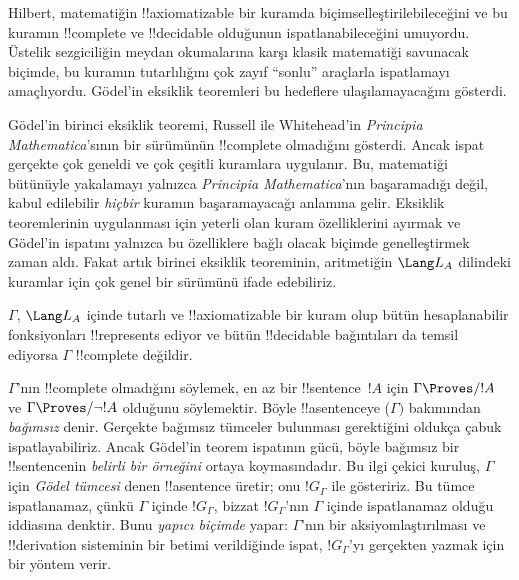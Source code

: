 



Hilbert, matematiğin !!{axiomatizable} bir kuramda biçimselleştirilebileceğini
ve bu kuramın !!{complete} ve !!{decidable} olduğunun ispatlanabileceğini
umuyordu. Üstelik sezgiciliğin meydan okumalarına karşı klasik matematiği
savunacak biçimde, bu kuramın tutarlılığını çok zayıf ``sonlu'' araçlarla
ispatlamayı amaçlıyordu. G\"odel'in eksiklik teoremleri bu hedeflere
ulaşılamayacağını gösterdi.

G\"odel'in birinci eksiklik teoremi, Russell ile Whitehead'in
\emph{Principia Mathematica}'sının bir sürümünün !!{complete} olmadığını
gösterdi. Ancak ispat gerçekte çok geneldi ve çok çeşitli kuramlara uygulanır.
Bu, matematiği bütünüyle yakalamayı yalnızca \emph{Principia Mathematica}'nın
başaramadığı değil, kabul edilebilir \emph{hiçbir} kuramın başaramayacağı
anlamına gelir. Eksiklik teoremlerinin uygulanması için yeterli olan kuram
özelliklerini ayırmak ve G\"odel'in ispatını yalnızca bu özelliklere bağlı
olacak biçimde genelleştirmek zaman aldı. Fakat artık birinci eksiklik
teoreminin, aritmetiğin $\Lang L_A$ dilindeki kuramlar için çok genel bir
sürümünü ifade edebiliriz.

\begin{thm}
$\Gamma$, $\Lang L_A$ içinde tutarlı ve !!{axiomatizable} bir kuram olup
bütün hesaplanabilir fonksiyonları !!{represents} ediyor ve bütün
!!{decidable} bağıntıları da temsil ediyorsa $\Gamma$ !!{complete} değildir.
\end{thm}

$\Gamma$'nın !!{complete} olmadığını söylemek, en az bir !!{sentence}~$!A$
için $\Gamma \Proves/ !A$ ve $\Gamma \Proves/ \lnot !A$ olduğunu söylemektir.
Böyle !!a{sentence}{}ye ($\Gamma)$ bakımından \emph{bağımsız} denir. Gerçekte
bağımsız tümceler bulunması gerektiğini oldukça çabuk ispatlayabiliriz.
Ancak G\"odel'in teorem ispatının gücü, böyle bağımsız bir !!{sentence}{}nin
\emph{belirli bir örneğini} ortaya koymasındadır. Bu ilgi çekici kuruluş,
$\Gamma$ için \emph{G\"odel tümcesi} denen !!a{sentence} üretir; onu
$!G_\Gamma$ ile gösteririz. Bu tümce ispatlanamaz, çünkü $\Gamma$ içinde $!G_\Gamma$, bizzat
$!G_\Gamma$'nın $\Gamma$ içinde ispatlanamaz olduğu iddiasına denktir.
Bunu \emph{yapıcı biçimde} yapar: $\Gamma$'nın bir aksiyomlaştırılması ve
!!{derivation} sisteminin bir betimi verildiğinde ispat, $!G_\Gamma$'yı
gerçekten yazmak için bir yöntem verir.

